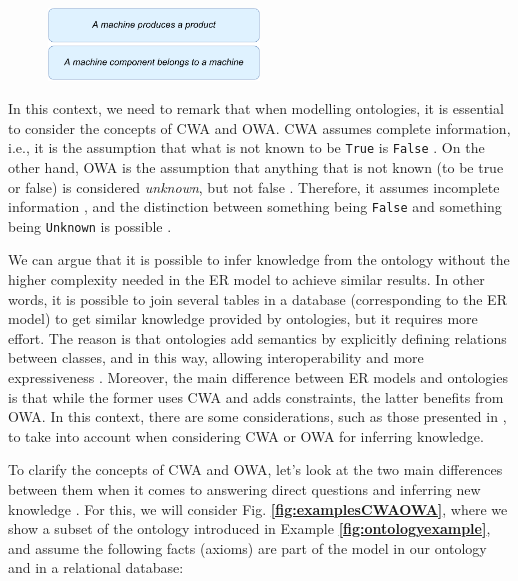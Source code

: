 \documentclass{guideline/sty/rapport}
\begin{document}
    \begin{figure}[H]
        \centering
          \includegraphics[width=0.5\textwidth]{images/implications1.pdf}
    \end{figure}

\newpage
In this context, we need to remark that when modelling ontologies, it is essential to consider the concepts of \ac{CWA} and \ac{OWA}. \ac{CWA} assumes complete information, i.e., it is the assumption that what is not known to be \colorbox{junglegreen!50}{\texttt{True}} is \colorbox{pastelred!50}{\texttt{False}} \cite{Keet13-2}. On the other hand, \ac{OWA} is the assumption that anything that is not known (to be true or false) is considered \textit{unknown}, but not false \cite{Ramis21}. Therefore, it assumes incomplete information \cite{Keet13-1}, and the distinction between something being \colorbox{pastelred!50}{\texttt{False}} and something being \colorbox{bananamania}{\texttt{Unknown}} is possible \cite{Uschold15}. \singlespacing

We can argue that it is possible to infer knowledge from the ontology without the higher complexity needed in the \ac{ER} model to achieve similar results. In other words, it is possible to join several tables in a database (corresponding to the \ac{ER} model) to get similar knowledge provided by ontologies, but it requires more effort. The reason is that ontologies add semantics by explicitly defining relations between classes, and in this way, allowing interoperability and more expressiveness \cite{Ramis21}. Moreover, the main difference between \ac{ER} models and ontologies is that while the former uses \ac{CWA} and adds constraints, the latter benefits from \ac{OWA}. In this context, there are some considerations, such as those presented in \cite{Uschold15}, to take into account when considering \ac{CWA} or \ac{OWA} for inferring knowledge. \singlespacing

To clarify the concepts of \ac{CWA} and \ac{OWA}, let's look at the two main differences between them when it comes to answering direct questions and inferring new knowledge \cite{Sequeda12}. For this, we will consider Fig. \textbf{\ref{fig:examplesCWAOWA}}, where we show a subset of the ontology introduced in Example \textbf{\ref{fig:ontologyexample}}, and assume the following facts (axioms) are part of the model in our ontology and in a relational database: \singlespacing
\end{document}
